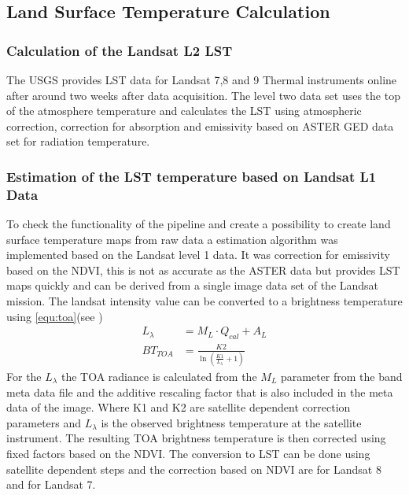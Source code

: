 \subsection{Land Surface Temperature Calculation}
\subsubsection{Calculation of the Landsat L2 LST}
The \ac{USGS} provides \ac{LST} data for Landsat 7,8 and 9 Thermal instruments\cite{EROASC2013}\cite{EROASC1999} online after around two weeks after data acquisition. 
The level two data set uses the top of the atmosphere temperature and calculates the \ac{LST} using atmospheric correction, correction for absorption and emissivity based on ASTER GED data set for radiation temperature.
%
\subsubsection{Estimation of the LST temperature based on Landsat L1 Data}\label{sec:lstcalc}
To check the functionality of the pipeline and create a possibility to create land surface temperature maps from raw data a estimation algorithm was implemented based on the Landsat level 1 data. It was correction for emissivity based on the \ac{NDVI}, this is not as accurate as the ASTER data but provides LST maps quickly and can be derived from a single image data set of the Landsat mission. 
The landsat intensity value can be converted to a  brightness temperature using \cref{equ:toa}(see \cite{usgsLSTLandsat})
\begin{equation}
    \begin{split}\label{equ:toa}
      L_{\lambda} &= M_L\cdot Q_{cal} + A_L \\
      BT_{TOA} &= \frac{K2}{\ln(\frac{K1}{L_{\lambda}} + 1)}
    \end{split}
\end{equation}
%
For the $L_{\lambda}$ the \ac{TOA} radiance is calculated from the $M_L$ parameter from the band meta data file and the additive rescaling factor that is also included in the meta data of the image. 
Where K1 and K2 are satellite dependent correction parameters and $L_{\lambda}$ is the observed brightness temperature at the satellite instrument. 
The resulting \ac{TOA} brightness temperature is then corrected using fixed factors based on the \ac{NDVI}. 
The conversion to \ac{LST} can be done using satellite dependent steps and the correction based on \ac{NDVI} are for Landsat 8  and for Landsat 7. %
